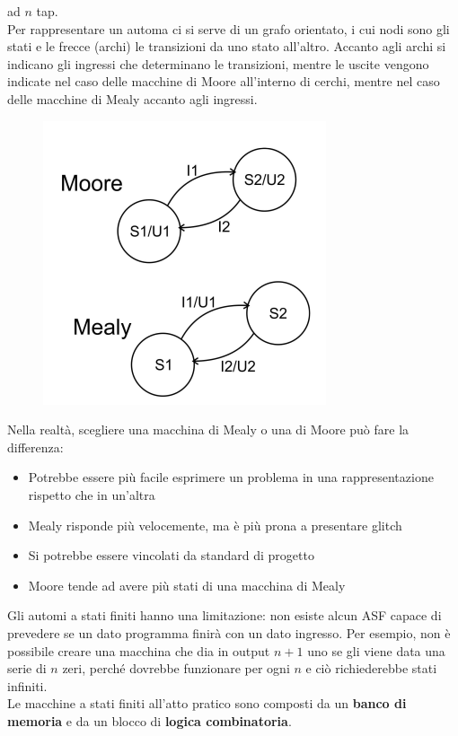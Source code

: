 \documentclass{book}
\begin{document}
        ad $n$ tap. \\
        Per rappresentare un automa ci si serve di un grafo orientato, i cui nodi sono gli stati e le frecce (archi) le transizioni da uno stato all'altro.
        Accanto agli archi si indicano gli ingressi che determinano le transizioni, mentre le uscite vengono indicate nel caso delle macchine di Moore all'interno
        di cerchi, mentre nel caso delle macchine di Mealy accanto agli ingressi.
        \begin{figure}[h!]
            \center  
            \includegraphics[width=0.6\linewidth]{img/chapt14img1.png}
        \end{figure}
        Nella realtà, scegliere una macchina di Mealy o una di Moore può fare la differenza:
        \begin{itemize}
            \item Potrebbe essere più facile esprimere un problema in una rappresentazione rispetto che in un'altra
            \item Mealy risponde più velocemente, ma è più prona a presentare glitch
            \item Si potrebbe essere vincolati da standard di progetto
            \item Moore tende ad avere più stati di una macchina di Mealy
        \end{itemize}
        Gli automi a stati finiti hanno una limitazione: non esiste alcun ASF capace di prevedere
        se un dato programma finirà con un dato ingresso. Per esempio, non è possibile creare una macchina che dia 
        in output $n+1$ uno se gli viene data una serie di $n$ zeri, perché dovrebbe funzionare per ogni $n$ e ciò richiederebbe
        stati infiniti. \\
        Le macchine a stati finiti all'atto pratico sono composti da un \textbf{banco di memoria} e da un blocco di \textbf{logica combinatoria}.
\end{document}
